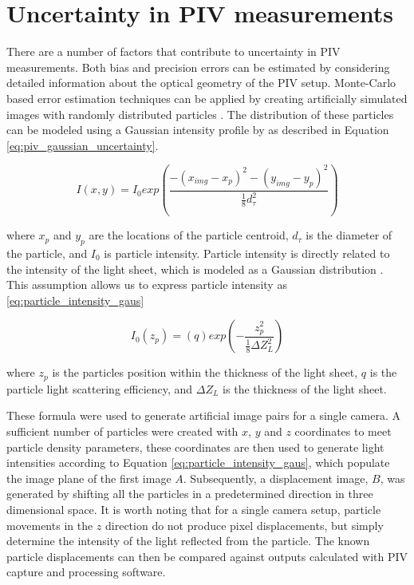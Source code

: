 \section{Uncertainty in PIV measurements}
\label{sec:piv_uncert}
 
There are a number of factors that contribute to uncertainty in PIV 
measurements. Both bias and precision errors can be estimated by considering 
detailed information about the optical geometry of the PIV setup. Monte-Carlo 
based error estimation techniques can be applied by creating artificially 
simulated images with randomly distributed particles \cite{adeyinka2005}. 
The distribution of these particles can be modeled using a Gaussian intensity  
profile by \cite{raffel1998} as described in Equation 
\ref{eq:piv_gaussian_uncertainty}.

\begin{equation}
	I(x,y) = I_0exp \left( \frac{-(x_{img} - x_p)^2 - (y_{img} - y_p)^2}
	{\frac{1}{8}d_\tau^2} \right)
	\label{eq:piv_gaussian_uncertainty}
\end{equation}

where $x_p$ and $y_p$ are the locations of the particle centroid, $d_\tau$ is 
the diameter of the particle, and $I_0$ is particle intensity. Particle 
intensity is directly related to the intensity of the light sheet, which is 
modeled as a Gaussian distribution \cite{PIVuncertAIAA}. This assumption allows 
us 
to express particle intensity as \ref{eq:particle_intensity_gaus}

\begin{equation}
	I_0(z_p) = (q)exp\left(- \frac{z_p^2}{\frac{1}{8}\Delta Z_L^2}\right)
	\label{eq:particle_intensity_gaus}
\end{equation}

where $z_p$ is the particles position within the thickness of the light sheet, 
$q$ is the particle light scattering efficiency, and $\Delta Z_L$ is the 
thickness of the light sheet.

These formula were used to generate artificial image pairs for a single camera. 
A sufficient number of particles were created with $x$, $y$ and $z$ coordinates 
to meet particle density parameters, these coordinates are then 
used to generate light intensities according to Equation 
\ref{eq:particle_intensity_gaus}, which populate the image plane of the first 
image $A$. Subsequently, a displacement image, $B$, was generated by shifting 
all the 
particles in a predetermined direction in three dimensional space. It is worth 
noting that for a single camera setup, particle movements in the $z$ direction 
do not produce pixel displacements, but simply determine the intensity of the 
light reflected from the particle. The known particle displacements can then be 
compared against outputs calculated with PIV capture and processing software.

